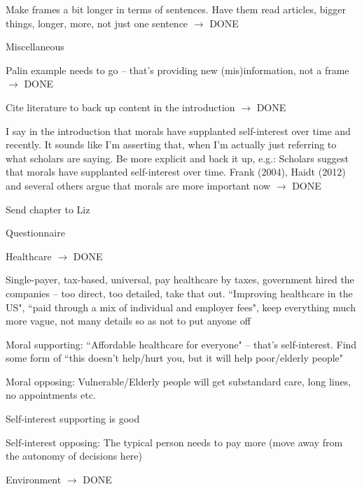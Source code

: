 \documentclass[12pt]{article}
\begin{document}
\begin{coi}
\begin{coi}
				\item Make frames a bit longer in terms of sentences. Have them read articles, bigger things, longer, more, not just one sentence $\rightarrow$ DONE
			\end{coi}
		\item Miscellaneous
			\begin{coi}
				\item Palin example needs to go -- that's providing new (mis)information, not a frame $\rightarrow$ DONE
				\item Cite literature to back up content in the introduction $\rightarrow$ DONE
				\item I say in the introduction that morals have supplanted self-interest over time and recently. It sounds like I'm asserting that, when I'm actually just referring to what scholars are saying. Be more explicit and back it up, e.g.: Scholars suggest that morals have supplanted self-interest over time. Frank (2004), Haidt (2012) and several others argue that morals are more important now $\rightarrow$ DONE
			\end{coi}
		\item Send chapter to Liz
		\item Questionnaire
			\begin{coi}
				\item Healthcare $\rightarrow$ DONE
					\begin{coi}
						\item Single-payer, tax-based, universal, pay healthcare by taxes, government hired the companies -- too direct, too detailed, take that out. ``Improving healthcare in the US", ``paid through a mix of individual and employer fees", keep everything much more vague, not many details so as not to put anyone off
						\item Moral supporting: ``Affordable healthcare for everyone" -- that's self-interest. Find some form of ``this doesn't help/hurt you, but it will help poor/elderly people"
						\item Moral opposing: Vulnerable/Elderly people will get substandard care, long lines, no appointments etc.
						\item Self-interest supporting is good
						\item Self-interest opposing: The typical person needs to pay more (move away from the autonomy of decisions here)
					\end{coi}
				\item Environment $\rightarrow$ DONE
					\begin{coi}

\end{coi}
\end{coi}
\end{coi}
\end{document}
